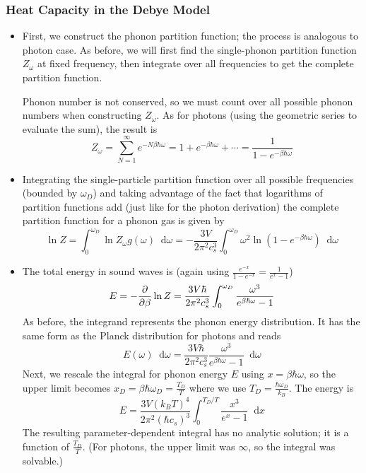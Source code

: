 \documentclass[11pt, a4paper]{article}
\newcommand{\diff}{\mathop{}\!\mathrm{d}} %
\begin{document}
\subsubsection{Heat Capacity in the Debye Model}
\begin{itemize}
	\item First, we construct the phonon partition function; the process is analogous to photon case. As before, we will first find the single-phonon partition function $ Z_{\omega} $ at fixed frequency, then integrate over all frequencies to get the complete partition function. 
	
	Phonon number is not conserved, so we must count over all possible phonon numbers when constructing $ Z_{\omega} $. As for photons (using the geometric series to evaluate the sum), the result is
	\begin{equation*}
		Z_{\omega} = \sum_{N=1}^{\infty}e^{-N \beta\hbar \omega} = 1 + e^{-\beta \hbar \omega} + \cdots = \frac{1}{1 - e^{-\beta \hbar \omega}}
	\end{equation*}
	
	\item Integrating the single-particle partition function over all possible frequencies (bounded by $ \omega_{D} $) and taking advantage of the fact that logarithms of partition functions add (just like for the photon derivation) the complete partition function for a phonon gas is given by
	\begin{equation*}
		\ln Z = \int_{0}^{\omega_{D}} \ln Z_{\omega}g(\omega)\diff \omega = - \frac{3V}{2\pi^{2}c_{s}^{3}}\int_{0}^{\omega_{D}} \omega^{2} \ln(1-e^{-\beta \hbar \omega})\diff \omega
	\end{equation*}
	
	\item The total energy in sound waves is (again using $\frac{e^{-x}}{1-e^{-x}} = \frac{1}{e^{x} -1}$)
	\begin{equation*}
		E = -\pdv{}{\beta} \ln Z = \frac{3V\hbar}{2\pi^{2}c_{s}^{3}} \int_{0}^{\omega_{D}}\frac{\omega^{3}}{e^{\beta\hbar\omega}-1}
	\end{equation*}
	As before, the integrand represents the phonon energy distribution. It has the same form as the Planck distribution for photons and reads
	\begin{equation*}
		E(\omega) \diff \omega = \frac{3V\hbar}{2\pi^{2}c_{s}^{3}}\frac{\omega^{3}}{e^{\beta \hbar \omega} - 1}\diff \omega
	\end{equation*}
	Next, we rescale the integral for phonon energy $ E $ using $ x = \beta \hbar \omega $, so the upper limit becomes $ x_{D} = \beta \hbar \omega_{D} = \frac{T_{D}}{T} $ where we use $ T_{D} = \frac{\hbar \omega_{D}}{k_{B}} $. The energy is
	\begin{equation*}
		E = \frac{3V(k_{B}T)^{4}}{2\pi^{2}(\hbar c_{s})^{3}} \int_{0}^{T_{D}/T} \frac{x^{3}}{e^{x}-1}\diff x
	\end{equation*}
	The resulting parameter-dependent integral has no analytic solution; it is a function of $ \frac{T_{D}}{T} $. (For photons, the upper limit was $ \infty $, so the integral was solvable.) 
	

\end{itemize}
\end{document}
